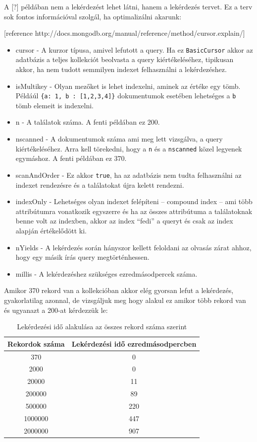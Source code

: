 A [?] példában nem a lekérdezést lehet látni, hanem a lekérdezés tervet. Ez a terv sok fontos információval szolgál, ha optimalizálni akarunk:

[reference http://docs.mongodb.org/manual/reference/method/cursor.explain/]

\begin{itemize}
                        
  \item{cursor} - A kurzor típusa, amivel lefutott a query. Ha ez \lstinline{BasicCursor} akkor az adatbázis a teljes kollekciót beolvasta a query kiértékeléséhez, tipikusan akkor, ha nem tudott semmilyen indexet felhasználni a lekérdezéshez.
  \item{isMultikey} -  Olyan mezőket is lehet indexelni, aminek az értéke egy tömb. Példáúl \lstinline|{a: 1, b : [1,2,3,4]}| dokumentumok esetében lehetséges a \lstinline{b} tömb elemeit is indexelni. 
  \item{n} - A találatok száma. A fenti példában ez 200.
  \item{nscanned} - A dokumentumok száma ami meg lett vizsgálva, a query kiértékeléséhez. Arra kell törekedni, hogy a \lstinline{n} és a \lstinline{nscanned} közel legyenek egymáshoz. A fenti példában ez 370.

   \item{scanAndOrder} - Ez akkor \lstinline{true}, ha az adatbázis nem tudta felhasználni az indexet rendezésre és a találatokat újra kelett rendezni.
   \item{indexOnly} - Lehetséges olyan indexet felépíteni -- compound index -- ami több attribútumra vonatkozik egyszerre és ha az összes attribútuma a találatoknak benne volt az indexben, akkor az index ``fedi'' a queryt és csak az index alapján értékelődött ki. 
   \item{nYields} - A lekérdezés során hányszor kellett feloldani az olvasás zárat ahhoz, hogy egy másik írás query megtörténhessen. 
   \item{millis} - A lekérdezéshez szükséges ezredmásodpercek száma.


\end{itemize}

Amikor 370 rekord van a kollekcióban akkor elég gyorsan lefut a lekérdezés, gyakorlatilag azonnal, de vizsgáljuk meg hogy alakul ez amikor több rekord van és ugyanazt a 200-at kérdezzük le:


\begin{table}[H]
\centering
\begin{tabular}{|c|c|}

\hline
Rekordok száma & Lekérdezési idő ezredmásodpercben \\
\hline
370 & 0 \\
2000 & 0 \\
20000 & 11 \\
200000 & 89 \\
500000 & 220 \\
1000000 & 447 \\
2000000 & 907  \\
\hline
\end{tabular}
\caption{Lekérdezési idő alakulása az összes rekord száma szerint } 
\end{table}

